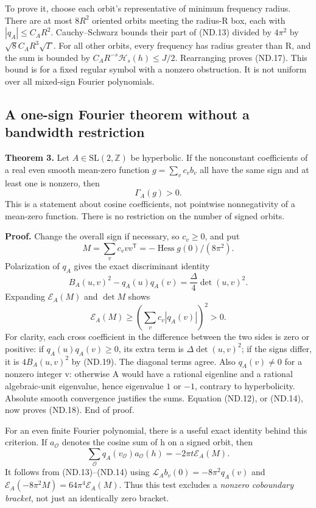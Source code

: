 \] To prove it, choose each orbit's representative of minimum frequency radius. There are at most \(8R^2\) oriented orbits meeting the radius-R box, each with \(|q_A|\leq C_AR^2\). Cauchy--Schwarz bounds their part of (ND.13) divided by \(4\pi^2\) by \(\sqrt8 C_AR^3\sqrt\Gamma\). For all other orbits, every frequency has radius greater than R, and the sum is bounded by \(C_AR^{-s}\mathcal H_s(h)\leq J/2\). Rearranging proves (ND.17). This bound is for a fixed regular symbol with a nonzero obstruction. It is not uniform over all mixed-sign Fourier polynomials.

\subsection{A one-sign Fourier theorem without a bandwidth restriction}\label{nondegeneracy:a-one-sign-fourier-theorem-without-a-bandwidth-restriction}

\textbf{Theorem 3.} Let \(A\in\mathrm{SL}(2,\mathbb Z)\) be hyperbolic. If the nonconstant coefficients of a real even smooth mean-zero function \(g=\sum_v c_vb_v\) all have the same sign and at least one is nonzero, then \[
                             \Gamma_A(g)>0.                 \tag{ND.18}
\] This is a statement about cosine coefficients, not pointwise nonnegativity of a mean-zero function. There is no restriction on the number of signed orbits.

\textbf{Proof.} Change the overall sign if necessary, so \(c_v\geq0\), and put \[
 M=\sum_v c_vvv^{\mathsf T}=-\operatorname{Hess}g(0)/(8\pi^2).
\] Polarization of \(q_A\) gives the exact discriminant identity \[
 B_A(u,v)^2-q_A(u)q_A(v)=\frac\Delta4\det(u,v)^2.            \tag{ND.19}
\] Expanding \(\mathcal E_A(M)\) and \(\det M\) shows \[
       \mathcal E_A(M)\geq\left(\sum_v c_v|q_A(v)|\right)^2>0.
 \tag{ND.20}
\] For clarity, each cross coefficient in the difference between the two sides is zero or positive: if \(q_A(u)q_A(v)\geq0\), its extra term is \(\Delta\det(u,v)^2\); if the signs differ, it is \(4B_A(u,v)^2\) by (ND.19). The diagonal terms agree. Also \(q_A(v)\ne0\) for a nonzero integer v: otherwise A would have a rational eigenline and a rational algebraic-unit eigenvalue, hence eigenvalue \(1\) or \(-1\), contrary to hyperbolicity. Absolute smooth convergence justifies the sums. Equation (ND.12), or (ND.14), now proves (ND.18). End of proof.

For an even finite Fourier polynomial, there is a useful exact identity behind this criterion. If \(a_{\mathcal O}\) denotes the cosine sum of h on a signed orbit, then \[
 \boxed{\sum_{\mathcal O}q_A(v_{\mathcal O})a_{\mathcal O}(h)
                         =-2\pi t\mathcal E_A(M).}          \tag{ND.21}
\] It follows from (ND.13)--(ND.14) using \(\mathcal L_A b_v(0)=-8\pi^2q_A(v)\) and \(\mathcal E_A(-8\pi^2M)=64\pi^4\mathcal E_A(M)\). Thus this test excludes a \emph{nonzero coboundary bracket}, not just an identically zero bracket.

